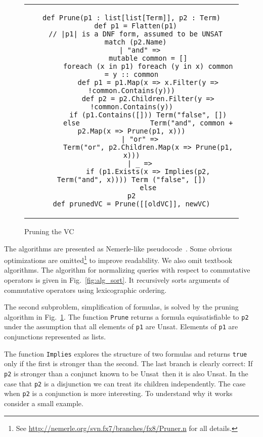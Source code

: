 \documentclass{llncs}
\def\lstinlinen{\lstinline[basicstyle=\normalsize\sffamily]}
\def\unsat{{\sc Unsat}}
\begin{document}
\begin{figure}[t]
  \centering
\begin{tabular}{c}
\begin{lstlisting}
def Prune(p1 : list[list[Term]], p2 : Term)
  def p1 = Flatten(p1)
  // |p1| is a DNF form, assumed to be UNSAT
  match (p2.Name)
    | "and" =>
        mutable common = []
        foreach (x in p1) foreach (y in x) common = y :: common
        def p1 = p1.Map(x => x.Filter(y => !common.Contains(y)))
        def p2 = p2.Children.Filter(y => !common.Contains(y))
        if (p1.Contains([])) Term("false", [])
        else                 Term("and", common + p2.Map(x => Prune(p1, x)))
    | "or" =>
        Term("or", p2.Children.Map(x => Prune(p1, x)))
    | _ =>
        if (p1.Exists(x => Implies(p2, Term("and", x)))) Term ("false", [])
        else                                             p2
def prunedVC = Prune([[oldVC]], newVC)
\end{lstlisting}
\end{tabular}
  \caption{Pruning the VC}
  \label{fig:alg_prune}
\end{figure}

The algorithms are presented as Nemerle-like pseudocode~\cite{nemerle}.
Some obvious optimizations are omitted\footnote{See
\url{http://nemerle.org/svn.fx7/branches/fx8/Pruner.n} for all details.} 
to improve readability. We also omit textbook algorithms.
The algorithm for normalizing queries with respect to 
commutative operators is given in Fig.~\ref{fig:alg_sort}.
It recursively sorts arguments of commutative operators
using lexicographic ordering.

The second subproblem, simplification of formulas, is
solved by the pruning algorithm in Fig.~\ref{fig:alg_prune}. 
The function \lstinlinen|Prune| returns a formula equisatisfiable
to \lstinlinen|p2| under the assumption that all elements
of \lstinlinen|p1| are \unsat. Elements of \lstinlinen|p1|
are conjunctions represented as lists.

The function \lstinlinen|Implies| explores the structure of two
formulas and returns \lstinlinen|true| only if the first is
stronger than the second. The last branch is clearly correct: 
If \lstinlinen|p2| is stronger than a conjunct known to be 
\unsat\ then it is also \unsat. In the case that 
\lstinlinen|p2| is a disjunction we can treat  its children 
independently. The case when \lstinlinen|p2| is
a conjunction is more interesting. To understand why it works
consider a small example.
\end{document}
